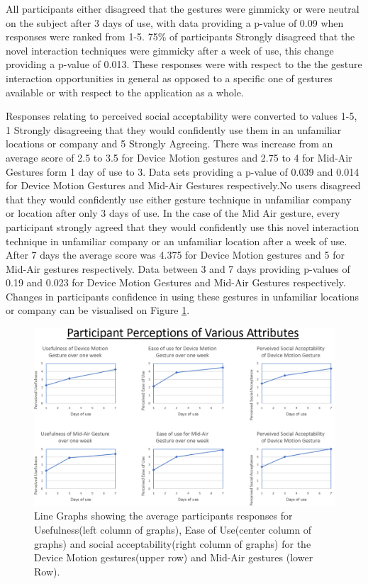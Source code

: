 \documentclass{l4proj}
\begin{document}
All participants either disagreed that the gestures were gimmicky or were neutral on the subject after 3 days of use, with data providing a p-value of 0.09 when responses were ranked from 1-5. 75\% of participants Strongly disagreed that the novel interaction techniques were gimmicky after a week of use, this change providing a p-value of 0.013. These responses were with respect to the the gesture interaction opportunities in general as opposed to a specific one of gestures available or with respect to the application as a whole.

Responses relating to perceived social acceptability were converted to values 1-5, 1 Strongly disagreeing that they would confidently use them in an unfamiliar locations or company and 5 Strongly Agreeing. There was increase from an average score of 2.5 to 3.5 for Device Motion gestures and 2.75 to 4 for Mid-Air Gestures form 1 day of use to 3. Data sets providing a p-value of 0.039 and 0.014 for Device Motion Gestures and Mid-Air Gestures respectively.No users disagreed that they would confidently use either gesture technique in unfamiliar company or location after only 3 days of use.  In the case of the Mid Air gesture, every participant strongly agreed that they would confidently use this novel interaction technique in unfamiliar company or an unfamiliar location after a week of use. After 7 days the average score was 4.375 for Device Motion gestures and 5 for Mid-Air gestures respectively. Data between 3 and 7 days providing p-values of 0.19 and 0.023 for Device Motion Gestures and Mid-Air Gestures respectively. Changes in participants confidence in using these gestures in unfamiliar locations or company can be visualised on Figure \ref{fig:perceptions}.

\begin{figure}[!htb]
    \centering
    \includegraphics[width=\textwidth]{images/perceptions.PNG}
        \caption{Line Graphs showing the average participants responses for Usefulness(left column of graphs), Ease of Use(center column of graphs) and social acceptability(right column of graphs) for the Device Motion gestures(upper row) and Mid-Air gestures (lower Row).}
        \label{fig:perceptions}
\end{figure}
\end{document}
